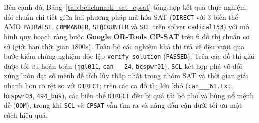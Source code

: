 \documentclass[a4paper,fleqn]{cas-sc}
\begin{document}
Bên cạnh đó, Bảng~\ref{tab:benchmark_sat_cpsat} tổng hợp kết quả thực nghiệm đối chuẩn chi tiết giữa hai phương pháp mã hóa SAT (\texttt{DIRECT} với 3 biến thể AMO \texttt{PAIRWISE}, \texttt{COMMANDER}, \texttt{SEQCOUNTER} và \texttt{SCL} trên solver \texttt{cadical153}) với mô hình quy hoạch ràng buộc \textbf{Google OR-Tools CP-SAT} trên 6 đồ thị chuẩn cơ sở (giới hạn thời gian $1800\text{s}$). Toàn bộ các nghiệm khả thi trả về đều vượt qua bước kiểm chứng nghiệm độc lập \texttt{verify\_solution} (\texttt{PASSED}). Trên các đồ thị giải được tối ưu hoàn toàn (\texttt{jgl011}, \texttt{can\_\_\_24}, \texttt{bcspwr01}), \texttt{SCL} kết hợp phá vỡ đối xứng luôn đạt số mệnh đề tích lũy thấp nhất trong nhóm SAT và thời gian giải nhanh hơn rõ rệt so với \texttt{DIRECT}; trên các ca đồ thị lớn khó (\texttt{can\_\_\_61.txt}, \texttt{bcspwr03}, \texttt{494\_bus}), các biến thể \texttt{DIRECT} đều bị quá tải bộ nhớ và bùng nổ mệnh đề (\texttt{OOM}), trong khi \texttt{SCL} và \texttt{CPSAT} vẫn tìm ra và nâng dần cận dưới tối ưu một cách hiệu quả.
\end{document}
